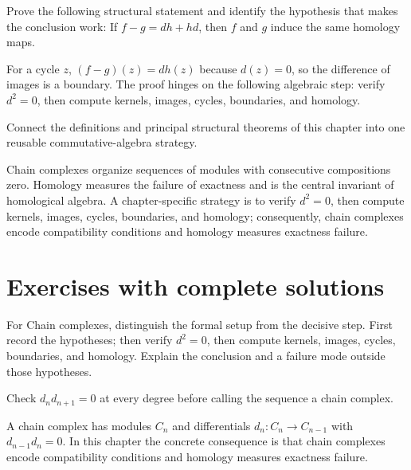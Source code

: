 \begin{problem}\label{prob:v22-problem-11}
Prove the following structural statement and identify the hypothesis that makes the conclusion work: If $f-g=dh+hd$, then $f$ and $g$ induce the same homology maps.
\end{problem}
\begin{solution}
For a cycle $z$, $(f-g)(z)=d h(z)$ because $d(z)=0$, so the difference of images is a boundary. The proof hinges on the following algebraic step: verify \(d^2=0\), then compute kernels, images, cycles, boundaries, and homology.
\end{solution}

\begin{problem}\label{prob:v22-problem-12}
Connect the definitions and principal structural theorems of this chapter into one reusable commutative-algebra strategy.
\end{problem}
\begin{solution}
Chain complexes organize sequences of modules with consecutive compositions zero. Homology measures the failure of exactness and is the central invariant of homological algebra. A chapter-specific strategy is to verify \(d^2=0\), then compute kernels, images, cycles, boundaries, and homology; consequently, chain complexes encode compatibility conditions and homology measures exactness failure.
\end{solution}

\section{Exercises with complete solutions}

\begin{exercise}\label{exr:v22-01}
For Chain complexes, distinguish the formal setup from the decisive step. First record the hypotheses; then verify \(d^2=0\), then compute kernels, images, cycles, boundaries, and homology. Explain the conclusion and a failure mode outside those hypotheses.
\end{exercise}
\begin{hint}
Check \(d_n d_{n+1}=0\) at every degree before calling the sequence a chain complex.
\end{hint}
\begin{solution}
A chain complex has modules $C_n$ and differentials $d_n:C_n\to C_{n-1}$ with $d_{n-1}d_n=0$. In this chapter the concrete consequence is that chain complexes encode compatibility conditions and homology measures exactness failure.
\end{solution}

